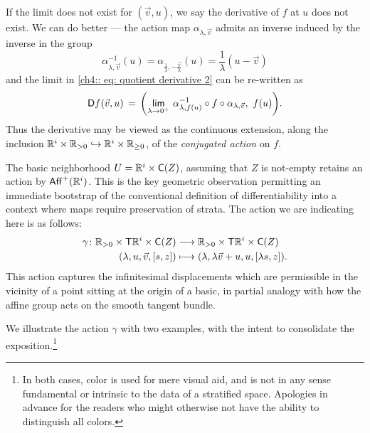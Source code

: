 \begin{observation}
\begin{align}
\end{align}
If the limit does not exist for $(\vec{v},u)$, we say the derivative of $f$ at $u$ does not exist. We can do better — the action map $\alpha_{\lambda,\vec{v}}$ admits an inverse induced by the inverse in the group
\begin{equation}
    \alpha_{\lambda,\vec{v}}^{-1}(u) = \alpha_{\frac{1}{\lambda},-\frac{\vec{v}}{\lambda}}(u) = \frac{1}{\lambda}(u-\vec{v})
\end{equation}
and the limit in \ref{ch4:: eq: quotient derivative 2} can be re-written as 
\begin{equation}
     \mathsf D f(\vec{v},u) \, = \, \bigg(\underset{\lambda \rightarrow 0^+}{\mathsf{lim}}\,\, \alpha_{\lambda,f(u)}^{-1}\circ f \circ \alpha_{\lambda,\vec{v}},\,\,f(u)\bigg).
\end{equation}
Thus the derivative may be viewed as the continuous extension, along the inclusion $\mathbb R^{i}\times \mathbb R_{>0} \hookrightarrow \mathbb R^{i}\times \mathbb R_{\geq 0}$, of the \emph{conjugated action} on $f$.

The basic neighborhood $U=\mathbb R^{i}\times \mathsf C(Z)$, assuming that $Z$ is not-empty retains an action by $\mathsf{Aff}^{+}(\mathbb R^{i})$. This is the key geometric observation permitting an immediate bootstrap of the conventional definition of differentiability into a context where maps require preservation of strata. The action we are indicating here is as follows:
\begin{align}
    \gamma \colon  \mathbb R_{>0} \times \mathsf T \mathbb R^{i} \times \mathsf C(Z) &\longrightarrow \mathbb R_{>0} \times \mathsf T \mathbb R^{i} \times \mathsf C(Z) \\
    (\lambda,u,\vec{v},[s,z]) &\longmapsto (\lambda, \lambda\vec{v} + u, u, [\lambda s,z]). 
\end{align}
This action captures the infinitesimal displacements which are permissible in the vicinity of a point sitting at the origin of a basic, in partial analogy with how the affine group acts on the smooth tangent bundle. 
\end{observation}

We illustrate the action $\gamma$ with two examples, with the intent to consolidate the exposition.\footnote{In both cases, color is used for mere visual aid, and is not in any sense fundamental or intrinsic to the data of a stratified space. Apologies in advance for the readers who might otherwise not have the ability to distinguish all colors.}


